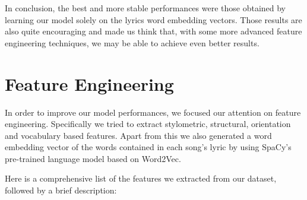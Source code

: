 In conclusion, the best and more stable performances were those obtained by learning our model solely on the lyrics word embedding vectors.
Those results are also quite encouraging and made us think that, with some more advanced feature engineering techniques,
we may be able to achieve even better results.

\section{Feature Engineering}
In order to improve our model performances, we focused our attention on feature engineering. Specifically we tried to extract stylometric, structural, orientation and vocabulary based features\cite{features}. Apart from this we also generated a word embedding vector of the words contained in each song's lyric by using SpaCy's\cite{spacy} pre-trained language model based on Word2Vec\cite{word2vec}.\par

Here is a comprehensive list of the features we extracted from our dataset, followed by a brief description:

